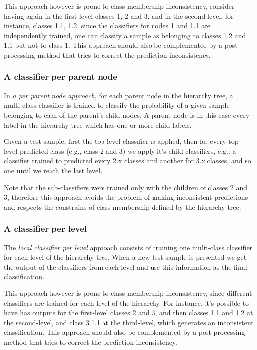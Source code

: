 \documentclass[11pt,a4paper]{article}
\begin{document}
This approach however is prone to class-membership inconsistency, consider having again in the first level
classes 1, 2 and 3, and in the second level, for instance, classes 1.1, 1.2, since the classifiers for nodes
1 and 1.1 are independently trained, one can classify a sample as belonging to classes 1.2 and 1.1
but not to class 1. This approach should also be complemented by a post-processing method that tries
to correct the prediction inconsistency.


\subsubsection{A classifier per parent node} %
In \textit{a per parent node approach}, for each parent node in the hierarchy tree, a multi-class
classifier is trained to classify the probability of a given sample belonging to each of the parent's
child nodes. A parent node is in this case every label in the hierarchy-tree which has one or more
child labels.

Given a test sample, first the top-level classifier is applied, then for every top-level
predicted class (e.g., class 2 and 3) we apply it's child classifiers, e.g.: a classifier
trained to predicted every 2.x classes and another for 3.x classes, and so one until we reach the
last level.

Note that the sub-classifiers were trained only with the children of classes 2 and 3, therefore
this approach avoids the problem of making inconsistent predictions and respects the constrains
of class-membership defined by the hierarchy-tree.


\subsubsection{A classifier per level} %
The \textit{local classifier per level} approach consists of training one multi-class classifier
for each level of the hierarchy-tree. When a new test sample is presented we get the output of the
classifiers from each level and use this information as the final classification.

This approach however is prone to class-membership inconsistency, since different classifiers are
trained for each level of the hierarchy. For instance, it's possible to have has outputs for the
first-level classes 2 and 3, and then classes 1.1 and 1.2 at the second-level, and class 3.1.1
at the third-level, which generates an inconsistent classification. This approach should also
be complemented by a post-processing method that tries to correct the prediction inconsistency.
\end{document}
